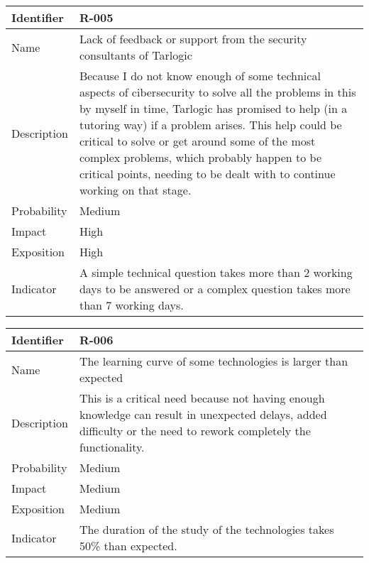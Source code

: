 \begin{table}[H]
	\begin{tabularx}{\textwidth}{|l|X|}
		\hline
		\rowcolor{gray!30}
		Identifier & \textbf{R-005} \\ \hline
		Name & Lack of feedback or support from the security consultants of Tarlogic\\ \hline
		Description & Because I do not know enough of some technical aspects of cibersecurity to solve all the problems in this by myself in time, Tarlogic has promised to help (in a tutoring way) if a problem arises.
		This help could be critical to solve or get around some of the most complex problems, which probably happen to be critical points, needing to be dealt with to continue working on that stage.\\ \hline
		Probability & Medium\\ \hline
		Impact &  High\\ \hline
		Exposition &  High\\ \hline
		Indicator & A simple technical question takes more than 2 working days to be answered or a complex question takes more than 7 working days.\\ \hline
	\end{tabularx}
\end{table}



\begin{table}[H]
	\begin{tabularx}{\textwidth}{|l|X|}
		\hline
		\rowcolor{gray!30}
		Identifier & \textbf{R-006} \\ \hline
		Name & The learning curve of some technologies is larger than expected\\ \hline
		Description & This is a critical need because not having enough knowledge can result in unexpected delays, added difficulty or the need to rework completely the functionality.\\ \hline
		Probability & Medium\\ \hline
		Impact &  Medium\\ \hline
		Exposition &  Medium\\ \hline
		Indicator & The duration of the study of the technologies takes 50\% than expected. \\ \hline
	\end{tabularx}
\end{table}

